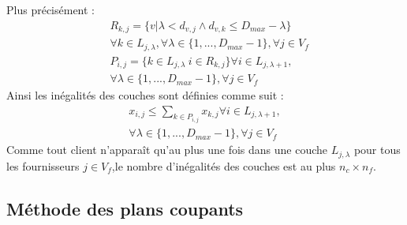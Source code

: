 \documentclass[letterpaper]{article}
\begin{document}
Plus précisément :
\begin{align*}
&R_{k,j} = \{ v | \lambda < d_{v,j} \wedge d_{v,k}\leq D_{max}-\lambda \} \\ 
&\forall k \in L_{j,\lambda}, \forall \lambda \in \{ 1,...,D_{max}-1 \}, \forall j \in V_{f}\\
&P_{i,j} = \{ k \in L_{j,\lambda} \ i \in R_{k,j} \} \forall i \in L_{j,\lambda +1}, \\ 
&  \forall \lambda \in \{ 1,...,D_{max}-1 \}, \forall j \in V_{f}
\end{align*}
Ainsi les inégalités des couches sont définies comme suit : 
\begin{equation}\label{eq:layers}
\begin{aligned}
x_{i,j} \leq \sum_{k\in P_{i,j}}{x_{k,j}} \forall i \in L_{j,\lambda +1}, \\ \forall \lambda \in \{ 1,...,D_{max}-1 \}, \forall j \in V_{f}
\end{aligned}
\end{equation}
Comme tout client n'apparaît qu'au plus une fois dans une couche $L_{j,\lambda}$ pour tous les fournisseurs $j \in V_{f}$,le nombre d'inégalités des couches est au plus $n_{c}\times n_{f}$.
\subsection{Méthode des plans coupants}
\end{document}
